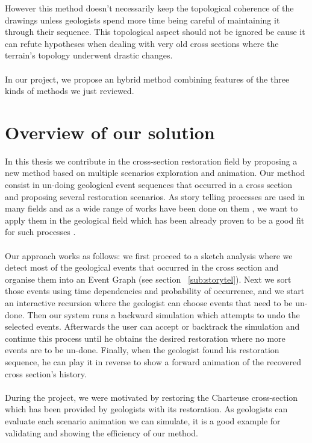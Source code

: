 \documentclass[12pt, a4paper]{report} %
\begin{document}
However this method doesn't necessarily keep the topological coherence of the drawings unless geologists spend more time being careful of maintaining it through their sequence. This topological aspect should not be ignored be cause it can refute hypotheses when dealing with very old cross sections where the terrain's topology underwent drastic changes.\\\\
In our project, we propose an hybrid method combining features of the three kinds of methods we just reviewed.
\chapter{Overview of our solution}
\label{overview}
In this thesis we contribute in the cross-section restoration field by proposing a new method based on multiple scenarios exploration and animation. Our method consist in un-doing geological event sequences that occurred in a cross section and proposing several restoration scenarios. As story telling processes are used in many fields and as a wide range of works have been done on them \cite{young}, we want to apply them in the geological field which has been already proven to be a good fit for such processes \cite{lidal}.\\\\
Our approach works as follows: we first proceed to a sketch analysis where we detect most of the geological events that occurred in the cross section and organise them into an Event Graph (see section ~\ref{sub:storytel}).
Next we sort those events using time dependencies and probability of occurrence, and we start an interactive recursion where the geologist can choose events that need to be un-done. Then our system runs a backward simulation which attempts to undo the selected events. Afterwards the user can accept or backtrack the simulation and continue this process until he obtains the desired restoration where no more events are to be un-done.
Finally, when the geologist found his restoration sequence, he can play it in reverse to show a forward animation of the recovered cross section's history.\\\\
During the project, we were motivated by restoring the Charteuse cross-section which has been provided by geologists with its restoration. As geologists can evaluate each scenario animation we can simulate, it is a good example for validating and showing the efficiency of our method.\\\\
\end{document}
